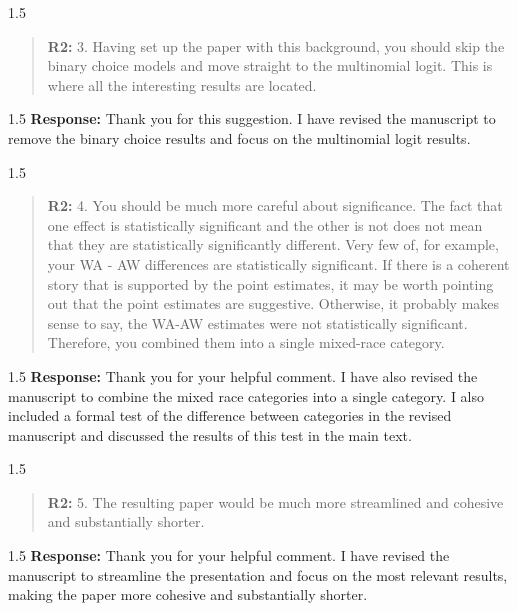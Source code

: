 \documentclass[12pt,english]{article}
\newcommand{\rrxspc}{1.5}
\begin{document}
\begin{refsection}
    \begin{spacing}{\rrxspc}
            \begin{quotation}
                \textbf{R2: } 3. Having set up the paper with this background, you should skip the binary choice models and move straight to the multinomial logit. This is where all
                the interesting results are located.
            \end{quotation}
    \end{spacing}
    \begin{spacing}{\rrxspc}
        \textbf{Response:} Thank you for this suggestion. I have revised the manuscript to remove the binary choice results and focus on the multinomial logit results. 
    \end{spacing}

    \begin{spacing}{\rrxspc}
            \begin{quotation}
                \textbf{R2: } 4. You should be much more careful about significance. The fact that one effect is statistically significant and the other is not does not mean that they are statistically significantly different. Very few of, for example, your WA - AW differences are statistically significant. If there is a coherent story that is supported by the point estimates, it may be worth pointing out that the point estimates are suggestive. Otherwise, it probably makes sense to say, the WA-AW estimates were not statistically significant. Therefore, you combined them into a single mixed-race category.
            \end{quotation}
    \end{spacing}
    \begin{spacing}{\rrxspc}
        \textbf{Response:} Thank you for your helpful comment. I have also revised the manuscript to combine the mixed race categories into a single category. I also included a formal test of the difference between categories in the revised manuscript and discussed the results of this test in the main text.
    \end{spacing}

    \begin{spacing}{\rrxspc}
            \begin{quotation}
                \textbf{R2: } 5. The resulting paper would be much more streamlined and cohesive and substantially shorter.
            \end{quotation}
    \end{spacing}
    \begin{spacing}{\rrxspc}
        \textbf{Response:} Thank you for your helpful comment. I have revised the manuscript to streamline the presentation and focus on the most relevant results, making the paper more cohesive and substantially shorter.
    \end{spacing}


\end{refsection}
\end{document}
